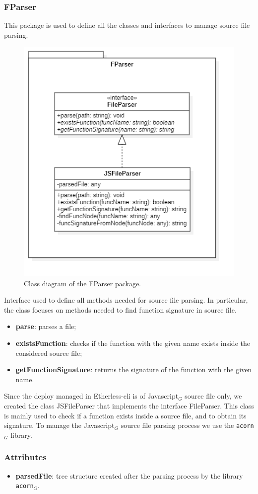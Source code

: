 		\subsubsection{FParser}
 		This package is used to define all the classes and interfaces to manage source file parsing.

		\begin{figure} [h!]
			\centering
			\includegraphics[width=0.5\linewidth]{diagrammi/etherless-cli/FParser}
			\caption{Class diagram of the FParser package.}
		\end{figure}

			Interface used to define all methods needed for source file parsing. In particular, the class focuses on methods needed to find function signature in source file.

					\begin{itemize}
						\item \textbf{parse}: parses a file;
						\item \textbf{existsFunction}: checks if the function with the given name exists inside the considered source file;
						\item \textbf{getFunctionSignature}: returns the signature of the function with the given name.
					\end{itemize}

			Since the deploy managed in Etherless-cli is of Javascript$_{G}$ source file only, we created the class JSFileParser that implements the interface FileParser. This class is mainly used to check if a function exists inside a source file, and to obtain its signature. To manage the Javascript$_{G}$ source file parsing process we use the \texttt{acorn}$_{G}$ library.

				\subsubsection*{Attributes}
					\begin{itemize}
						\item \textbf{parsedFile}: tree structure created after the parsing process by the library \texttt{acorn}$_{G}$.
					\end{itemize}

